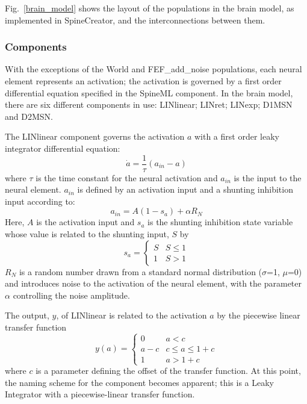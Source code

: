 \documentclass{frontiersSCNS}
\begin{document}

Fig.~\ref{brain_model} shows the layout of the populations in the
brain model, as implemented in SpineCreator, and the interconnections
between them. 

\subsubsection{Components}

With the exceptions of the World and FEF\_add\_noise populations, each
neural element represents an activation; the activation is governed by
a first order differential equation specified in the SpineML
component. In the brain model, there are six different components in
use: LINlinear; LINret; LINexp; D1MSN and D2MSN.

The LINlinear component governs the activation $a$ with a first order
leaky integrator differential equation:
\begin{equation}
   \dot{a} = \frac{1}{\tau}(a_{in}-a)
\end{equation}
where $\tau$ is the time constant for the neural activation and
$a_{in}$ is the input to the neural element. $a_{in}$ is defined by an
activation input and a shunting inhibition input according to:
\begin{equation}
   a_{in} = A(1-s_a)+\alpha R_N
\end{equation}
Here, $A$ is the activation input and $s_a$ is the shunting inhibition
state variable whose value is related to the shunting input, $S$ by
\begin{equation}
   s_a = \begin{cases}
      S & S\leq 1 \\
      1 & S > 1
   \end{cases}
\end{equation}
$R_N$ is a random number drawn from a standard normal distribution
($\sigma$=1, $\mu$=0) and introduces noise to the activation of the
neural element, with the parameter $\alpha$ controlling the noise
amplitude.

The output, $y$, of LINlinear is related to the activation $a$ by the
piecewise linear transfer function
\begin{equation} \label{eq:lintransfunc}
   y(a) = \begin{cases}
      0   & a < c \\
      a-c & c \leq a \leq 1+c \\
      1   & a > 1+c
   \end{cases}
\end{equation}
where $c$ is a parameter defining the offset of the transfer
function.  At this point, the naming scheme for the
component becomes apparent; this is a Leaky Integrator with a
piecewise-linear transfer function.
\end{document}
